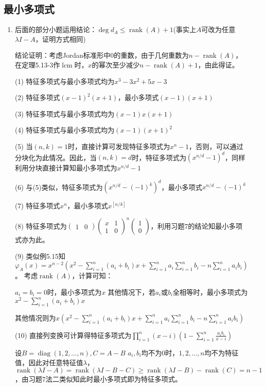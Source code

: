 \documentclass[a4paper,UTF8,fontset=windows]{ctexart}
\DeclareMathOperator{\diag}{diag}
\DeclareMathOperator{\lcm}{lcm}
\DeclareMathOperator{\rank}{rank}
\begin{document}
\subsection{最小多项式}
\begin{enumerate}
\item
后面的部分小题运用结论：$\deg{d_A}\le\rank(A)+1$(事实上$A$可改为任意$\lambda I-A$，证明方式相同)

结论证明：考虑Jordan标准形中0的重数，由于几何重数为$n-\rank(A)$，在定理5.13-3作$\lcm$时，$x$的幂次至少减少$n-\rank(A)+1$，由此得证。

(1) 特征多项式与最小多项式均为$x^3-3x^2+5x-3$

(2) 特征多项式$(x-1)^2(x+1)$，最小多项式$(x-1)(x+1)$

(3) 特征多项式与最小多项式均为$(x-1)x(x+1)$

(4) 特征多项式与最小多项式均为$(x-1)(x+1)^2$

(5) 当$(n,k)=1$时，直接计算可发现特征多项式为$x^n-1$，否则，可以通过分块化为此情况。因此，当$(n,k)=d$时，特征多项式为$(x^{n/d}-1)^d$，同样利用分块直接计算知最小多项式为$x^{n/d}-1$

(6) 与(5)类似，特征多项式为$(x^{n/d}-(-1)^k)^d$，最小多项式$x^{n/d}-(-1)^k$

(7) 特征多项式$x^n$，最小多项式$x^{[n/k]}$

(8) 特征多项式为$\begin{pmatrix}1&0\end{pmatrix}\begin{pmatrix}x&1\\1&0\end{pmatrix}^n\begin{pmatrix}1\\0\end{pmatrix}$，利用习题7的结论知最小多项式亦为此。

(9) 类似例5.15知$\varphi_A(x)=x^{n-2}\left(x^2-\sum_{i=1}^{n}(a_i+b_i)x+\sum_{i=1}^{n}{a_i\sum_{i=1}^{n}b_i}-n\sum_{i=1}^{n}a_ib_i\right)$。
考虑$\rank(A)$，计算可知：

$a_i=b_i=0$时，最小多项式为$x$
其他情况下，若$a_i$或$b_i$全相等时，最小多项式为$x^2-\sum_{i=1}^{n}(a_i+b_i)x$

其他情况则为$x\left(x^2-\sum_{i=1}^{n}(a_i+b_i)x+\sum_{i=1}^{n}{a_i\sum_{i=1}^{n}b_i}-n\sum_{i=1}^{n}a_ib_i\right)$

(10) 直接列变换可计算得特征多项式为$\prod_{i=1}^{n}(x-i)\left(1-\sum_{i=1}^{n}\frac{a_ib_i}{x-i}\right)$

设$B=\diag(1,2,\dots,n),C=A-B$
$a_i,b_i$均不为0时，$1,2,\dots,n$均不为特征值，因此对任意特征值$\lambda$，$\rank(\lambda I-A)=\rank(\lambda I-B-C)\ge\rank(\lambda I-B)-\rank(C)=n-1$，由习题7法二类似知此时最小多项式即为特征多项式。


\end{enumerate}
\end{document}
